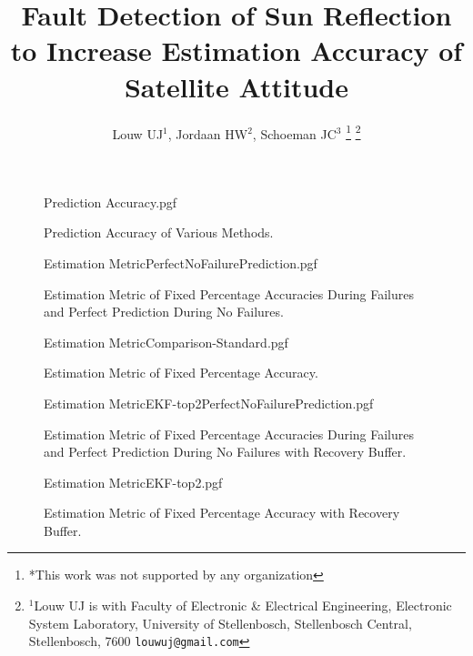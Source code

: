 \documentclass[letterpaper, 10 pt, conference]{ieeeconf}  %
\title{\LARGE \bf
	Fault Detection of Sun Reflection to Increase Estimation Accuracy of Satellite Attitude
}
\author{Louw UJ$^{1}$, Jordaan HW$^{2}$, Schoeman JC$^{3}$%
	\thanks{*This work was not supported by any organization}%
	\thanks{$^{1}$Louw UJ is with Faculty of Electronic \& Electrical Engineering, Electronic System            Laboratory, University of Stellenbosch, Stellenbosch Central, Stellenbosch, 7600
		{\tt\small louwuj@gmail.com}}%
}
\begin{document}
	
	\begin{figure}[!htb]
		\begin{center}
			{Prediction Accuracy.pgf}
		\end{center}
		\caption[Prediction Accuracy of Various Methods]{Prediction Accuracy of Various Methods.}
		\label{fig:Prediction Accuracy EKF-ignore summary}
	\end{figure}
	
	
	\begin{figure}[!htb]
		\begin{center}
			{Estimation MetricPerfectNoFailurePrediction.pgf}
		\end{center}
		\caption[Estimation Metric of Fixed Percentage Accuracies During Failures and Perfect Prediction During No Failures]{Estimation Metric of Fixed Percentage Accuracies During Failures and Perfect Prediction During No Failures.}
		\label{fig:Estimation Accuracy EKF-ignore Comparison PerfectNoFailure}
	\end{figure}
	
	\begin{figure}[!htb]
		\begin{center}
			{Estimation MetricComparison-Standard.pgf}
		\end{center}
		\caption[Estimation Metric of Fixed Percentage Accuracy]{Estimation Metric of Fixed Percentage Accuracy.}
		\label{fig:Estimation Accuracy EKF-ignore Comparison}
	\end{figure}
	
	\begin{figure}[!htb]
		\begin{center}
			{Estimation MetricEKF-top2PerfectNoFailurePrediction.pgf}
		\end{center}
		\caption[Estimation Metric of Fixed Percentage Accuracies During Failures and Perfect Prediction During No Failures with Recovery Buffer]{Estimation Metric of Fixed Percentage Accuracies During Failures and Perfect Prediction During No Failures with Recovery Buffer.}
		\label{fig:Estimation Accuracy EKF-ignore PerfectNoFailure with Recovery Buffer}
	\end{figure}
	
	\begin{figure}[!htb]
		\begin{center}
			{Estimation MetricEKF-top2.pgf}
		\end{center}
		\caption[Estimation Metric of Fixed Percentage Accuracy with Recovery Buffer]{Estimation Metric of Fixed Percentage Accuracy with Recovery Buffer.}
		\label{fig:Estimation Accuracy EKF-ignore with Recovery Buffer}
	\end{figure}
	
\end{document}
